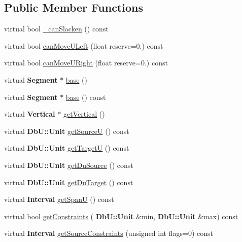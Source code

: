 \subsection*{Public Member Functions}
\begin{DoxyCompactItemize}
\item 
virtual bool \mbox{\hyperlink{classKatabatic_1_1AutoVertical_a2ced98fb06f208aa88c0962a706e64db}{\+\_\+can\+Slacken}} () const
\item 
virtual bool \mbox{\hyperlink{classKatabatic_1_1AutoVertical_a9b0c21eeb26c256876592ba63438da74}{can\+Move\+U\+Left}} (float reserve=0.) const
\item 
virtual bool \mbox{\hyperlink{classKatabatic_1_1AutoVertical_ad0c972e34d6bac47bd9276a7d6e053d8}{can\+Move\+U\+Right}} (float reserve=0.) const
\item 
virtual \textbf{ Segment} $\ast$ \mbox{\hyperlink{classKatabatic_1_1AutoVertical_a9e651c17b47f82166a02865c9296a2df}{base}} ()
\item 
virtual \textbf{ Segment} $\ast$ \mbox{\hyperlink{classKatabatic_1_1AutoVertical_a6f14a3faa93f2c610ea0d2cc7d903706}{base}} () const
\item 
virtual \textbf{ Vertical} $\ast$ \mbox{\hyperlink{classKatabatic_1_1AutoVertical_ab6a809b6f3ef3cf5385fa35580e31e7a}{get\+Vertical}} ()
\item 
virtual \textbf{ Db\+U\+::\+Unit} \mbox{\hyperlink{classKatabatic_1_1AutoVertical_ad521ffba761b0e81b7b81b99d62f76f9}{get\+SourceU}} () const
\item 
virtual \textbf{ Db\+U\+::\+Unit} \mbox{\hyperlink{classKatabatic_1_1AutoVertical_a4d52a506cd19dfa8e22e1dc0695bd960}{get\+TargetU}} () const
\item 
virtual \textbf{ Db\+U\+::\+Unit} \mbox{\hyperlink{classKatabatic_1_1AutoVertical_a760500b1fd027c71f5362dd8c0b01ea7}{get\+Du\+Source}} () const
\item 
virtual \textbf{ Db\+U\+::\+Unit} \mbox{\hyperlink{classKatabatic_1_1AutoVertical_a76e349c14c904b3300a15caa1ee8b680}{get\+Du\+Target}} () const
\item 
virtual \textbf{ Interval} \mbox{\hyperlink{classKatabatic_1_1AutoVertical_a0b5ac47ab175815e1a9bc07f2517614a}{get\+SpanU}} () const
\item 
virtual bool \mbox{\hyperlink{classKatabatic_1_1AutoVertical_a16737e7f2b77f8595fd2b607fac0f2f5}{get\+Constraints}} (\textbf{ Db\+U\+::\+Unit} \&min, \textbf{ Db\+U\+::\+Unit} \&max) const
\item 
virtual \textbf{ Interval} \mbox{\hyperlink{classKatabatic_1_1AutoVertical_a3239751f475bc65adb9d56f6c771ebb0}{get\+Source\+Constraints}} (unsigned int flags=0) const

\end{DoxyCompactItemize}
